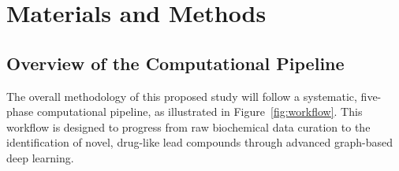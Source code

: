 \section{Materials and Methods}
\subsection{Overview of the Computational Pipeline}

The overall methodology of this proposed study will follow a systematic, five-phase computational pipeline, as illustrated in Figure~\ref{fig:workflow}. This workflow is designed to progress from raw biochemical data curation to the identification of novel, drug-like lead compounds through advanced graph-based deep learning.


